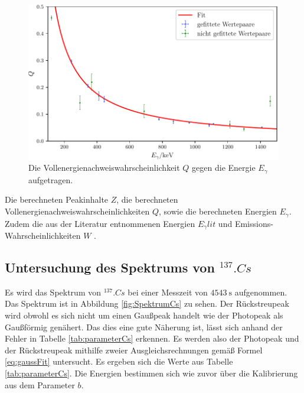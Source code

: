 \begin{figure}
	\centering
	\includegraphics[width=\linewidth-60pt,height=\textheight-60pt,keepaspectratio]{content/images/Q.pdf}
	\caption{Die Vollenergienachweiswahrscheinlichkeit $Q$ gegen die Energie $E_\gamma$ aufgetragen.}
	\label{fig:Q}
\end{figure}

\begin{table}
	\centering
	\caption{Die berechneten Peakinhalte $Z$, die berechneten Vollenergienachweiswahrscheinlichkeiten $Q$, sowie die berechneten Energien $E_\gamma$. Zudem die aus der Literatur entnommenen Energien $E_\gamma^.{lit}$ und Emissions-Wahrscheinlichkeiten $W$ \cite{MARTIN20131497}.}
	
	\label{tab:Q}
\end{table}

\subsection{Untersuchung des Spektrums von $^{137}.{Cs}$}

Es wird das Spektrum von $^{137}.{Cs}$ bei einer Messzeit von $\SI{4543}{\second}$ aufgenommen. Das Spektrum ist in Abbildung \ref{fig:SpektrumCs} zu sehen. Der Rückstreupeak wird obwohl es sich nicht um einen Gaußpeak handelt wie der Photopeak als Gaußförmig genähert. Das dies eine gute Näherung ist, lässt sich anhand der Fehler in Tabelle \ref{tab:parameterCs} erkennen. Es werden also der Photopeak und der Rückstreupeak mithilfe zweier Ausgleichsrechnungen gemäß Formel \eqref{eq:gaussFit} untersucht. Es ergeben sich die Werte aus Tabelle \ref{tab:parameterCs}. Die Energien bestimmen sich wie zuvor über die Kalibrierung aus dem Parameter $b$.    

